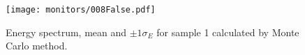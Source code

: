 \begin{figure}[htb]
\texttt{[image: monitors/008False.pdf]}
\caption{Energy spectrum, mean and $\pm 1\sigma_E$ for sample 1 calculated by Monte Carlo method.}
\label{fig:Spectrum1}
\end{figure}

